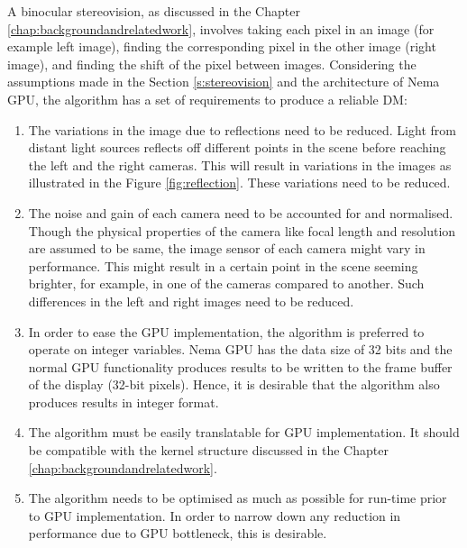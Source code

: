 A binocular stereovision, as discussed in the Chapter \ref{chap:backgroundandrelatedwork}, involves taking each pixel in an image (for example left image), finding the corresponding pixel in the other image (right image), and finding the shift of the pixel between images. Considering the assumptions made in the Section \ref{s:stereovision} and the architecture of Nema GPU, the algorithm has a set of requirements to produce a reliable DM:
\begin{enumerate}
    \item The variations in the image due to reflections need to be reduced. Light from distant light sources reflects off different points in the scene before reaching the left and the right cameras. This will result in variations in the images as illustrated in the Figure \ref{fig:reflection}. These variations need to be reduced.
    \item The noise and gain of each camera need to be accounted for and normalised. Though the physical properties of the camera like focal length and resolution are assumed to be same, the image sensor of each camera might vary in performance. This might result in a certain point in the scene seeming brighter, for example, in one of the cameras compared to another. Such differences in the left and right images need to be reduced.
    \item In order to ease the GPU implementation, the algorithm is preferred to operate on integer variables. Nema GPU has the data size of 32 bits and the normal GPU functionality produces results to be written to the frame buffer of the display (32-bit pixels). Hence, it is desirable that the algorithm also produces results in integer format.
    \item The algorithm must be easily translatable for GPU implementation. It should be compatible with the kernel structure discussed in the Chapter \ref{chap:backgroundandrelatedwork}.
    \item The algorithm needs to be optimised as much as possible for run-time prior to GPU implementation. In order to narrow down any reduction in performance due to GPU bottleneck, this is desirable.
\end{enumerate}

